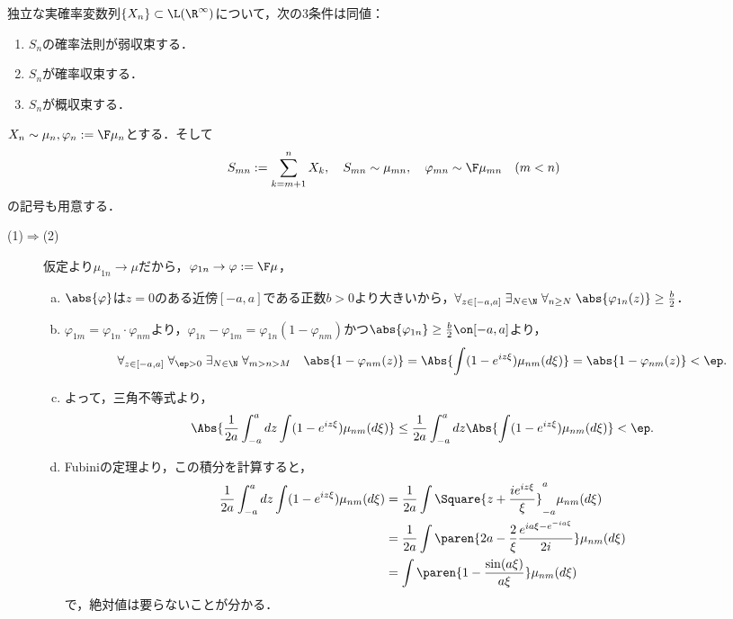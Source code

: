 \documentclass[uplatex,dvipdfmx]{jsreport}
\begin{document}
\begin{theorem}
    独立な実確率変数列$\{X_n\}\subset\L(\R^\infty)$について，次の3条件は同値：
    \begin{enumerate}
        \item $S_n$の確率法則が弱収束する．
        \item $S_n$が確率収束する．
        \item $S_n$が概収束する．
    \end{enumerate}
\end{theorem}
\begin{Proof}
    $X_n\sim\mu_n,\varphi_n:=\F\mu_n$とする．そして
    \[S_{mn}:=\sum_{k=m+1}^nX_k,\quad S_{mn}\sim\mu_{mn},\quad\varphi_{mn}\sim\F\mu_{mn}\quad(m<n)\]
    の記号も用意する．
    \begin{description}
        \item[(1)$\Rightarrow$(2)] 仮定より$\mu_{1n}\to\mu$だから，$\varphi_{1n}\to\varphi:=\F\mu$，
        \begin{enumerate}[(a)]
            \item $\abs{\varphi}$は$z=0$のある近傍$[-a,a]$である正数$b>0$より大きいから，$\forall_{z\in[-a,a]}\;\exists_{N\in\N}\;\forall_{n\ge N}\;\abs{\varphi_{1n}(z)}\ge\frac{b}{2}$．
            \item $\varphi_{1m}=\varphi_{1n}\cdot\varphi_{nm}$より，$\varphi_{1n}-\varphi_{1m}=\varphi_{1n}(1-\varphi_{nm})$かつ$\abs{\varphi_{1n}}\ge\frac{b}{2}\on[-a,a]$より，
            \[\forall_{z\in[-a,a]}\;\forall_{\ep>0}\;\exists_{N\in\N}\;\forall_{m>n>M}\quad\abs{1-\varphi_{nm}(z)}=\Abs{\int(1-e^{iz\xi})\mu_{nm}(d\xi)}=\abs{1-\varphi_{nm}(z)}<\ep.\]
            \item よって，三角不等式より，
            \[\Abs{\frac{1}{2a}\int^a_{-a}dz\int(1-e^{iz\xi})\mu_{nm}(d\xi)}\le\frac{1}{2a}\int^a_{-a}dz\Abs{\int(1-e^{iz\xi})\mu_{nm}(d\xi)}<\ep.\]
            \item Fubiniの定理より，この積分を計算すると，
            \begin{align*}
                \frac{1}{2a}\int^a_{-a}dz\int(1-e^{iz\xi})\mu_{nm}(d\xi)&=\frac{1}{2a}\int\Square{z+\frac{ie^{iz\xi}}{\xi}}^a_{-a}\mu_{nm}(d\xi)\\
                &=\frac{1}{2a}\int\paren{2a-\frac{2}{\xi}\frac{e^{ia\xi-e^{-ia\xi}}}{2i}}\mu_{nm}(d\xi)\\
                &=\int\paren{1-\frac{\sin(a\xi)}{a\xi}}\mu_{nm}(d\xi)
            \end{align*}
            で，絶対値は要らないことが分かる．

\end{enumerate}
\end{description}
\end{Proof}
\end{document}

